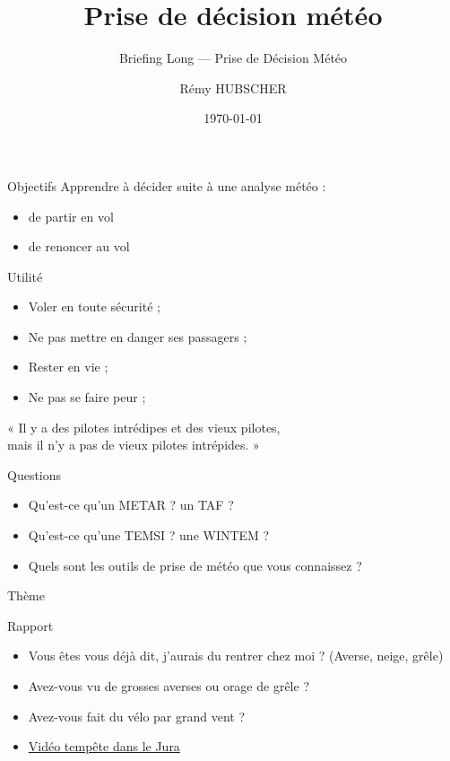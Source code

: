 \documentclass{beamer}
\author{Rémy HUBSCHER}
\begin{document}
  \title[Briefing Long — Prise de Décision Météo]{Prise de décision météo}
  \subtitle{Briefing Long — Prise de Décision Météo}
\date{\today} 

\begin{frame}[plain]
  \titlepage
\end{frame}

\begin{frame}{Objectifs}
  Apprendre à décider suite à une analyse météo :
  \begin{itemize}
    \item de partir en vol \pause
    \item de renoncer au vol \pause
  \end{itemize}
\end{frame}

\begin{frame}{Utilité}
  \begin{itemize}
    \item Voler en toute sécurité ; \pause
    \item Ne pas mettre en danger ses passagers ; \pause
    \item Rester en vie ; \pause
    \item Ne pas se faire peur ; \pause
  \end{itemize}

  \parskip=20pt

  \begin{center}
    « Il y a des pilotes intrédipes et des vieux pilotes,\\
    mais il n'y a pas de vieux pilotes intrépides. »
  \end{center}
\end{frame}

\begin{frame}{Questions}
  \begin{itemize}
    \item Qu'est-ce qu'un METAR ? \pause un TAF ? \pause
    
    \item Qu'est-ce qu'une TEMSI ? \pause une WINTEM ? \pause
    \item Quels sont les outils de prise de météo que vous connaissez ?
  \end{itemize}  
\end{frame}

\begin{frame}{Thème}
  \tableofcontents
\end{frame}

\begin{frame}{Rapport}
  \begin{itemize}
    \item Vous êtes vous déjà dit, j'aurais du rentrer chez moi ? \pause (Averse, neige, grêle)
    \item Avez-vous vu de grosses averses ou orage de grêle ?
    \item Avez-vous fait du vélo par grand vent ?
    \item \href{https://www.youtube.com/watch?v=zIhQlqZ7UN8}{Vidéo tempête dans le Jura}
  \end{itemize}  
\end{frame}
\end{document}
